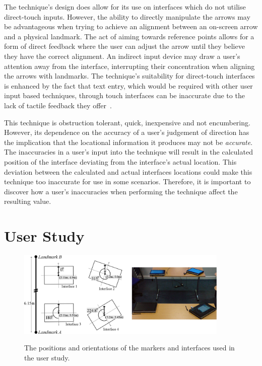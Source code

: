 \documentclass{bmcart}
\begin{document}
The technique's design does allow for its use on interfaces which do not utilise direct-touch inputs.
However, the ability to directly manipulate the arrows may be advantageous when trying to achieve an alignment between an on-screen arrow and a physical landmark. 
The act of aiming towards reference points allows for a form of direct feedback where the user can adjust the arrow until they believe they have the correct alignment.  
An indirect input device may draw a user's attention away from the interface, interrupting their concentration when aligning the arrows with landmarks.
The technique's suitability for direct-touch interfaces is enhanced by the fact that text entry, which would be required with other user input based techniques, through touch interfaces can be inaccurate due to the lack of tactile feedback they offer~\cite{Weiss2009}.

This technique is obstruction tolerant, quick, inexpensive and not encumbering.
However, its dependence on the accuracy of a user's judgement of direction has the implication that the locational information it produces may not be \textit{accurate}.
The inaccuracies in a user's input into the technique will result in the calculated position of the interface deviating from the interface's actual location.
This deviation between the calculated and actual interfaces locations could make this technique too inaccurate for use in some scenarios.
Therefore, it is important to discover how a user's inaccuracies when performing the technique affect the resulting value.

\section*{User Study}\label{sec:study}

\begin{figure}[ht]
  \centering
   \caption{The positions and orientations of the markers and interfaces used in the user study.}
  \includegraphics[width=0.9\textwidth]{figures/studyLayout.png}
   \label{fig:room}
\end{figure}
\end{document}
